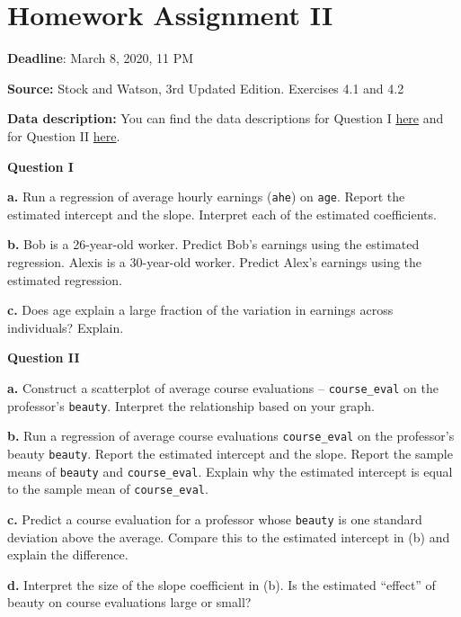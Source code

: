 \documentclass[
]{book}
\begin{document}
\hypertarget{homework-assignment-ii}{%
\chapter{Homework Assignment II}\label{homework-assignment-ii}}

\textbf{Deadline}: March 8, 2020, 11 PM

\textbf{Source:} Stock and Watson, 3rd Updated Edition. Exercises 4.1 and 4.2

\textbf{Data description:} You can find the data descriptions for Question I \href{https://wps.pearsoned.com/wps/media/objects/11422/11696965/empirical/empex_tb/CPS08_Description.pdf}{here} and for Question II \href{https://wps.pearsoned.com/wps/media/objects/11422/11696965/empirical/empex_tb/TeachingRatings_Description.pdf}{here}.

\textbf{Question I}

\textbf{a.} Run a regression of average hourly earnings (\texttt{ahe}) on \texttt{age}. Report the estimated intercept and the slope. Interpret each of the estimated coefficients.

\textbf{b.} Bob is a 26-year-old worker. Predict Bob's earnings using the estimated regression. Alexis is a 30-year-old worker. Predict Alex's earnings using the estimated regression.

\textbf{c.} Does age explain a large fraction of the variation in earnings across individuals? Explain.

\textbf{Question II}

\textbf{a.} Construct a scatterplot of average course evaluations -- \texttt{course\_eval} on the professor's \texttt{beauty}. Interpret the relationship based on your graph.

\textbf{b.} Run a regression of average course evaluations \texttt{course\_eval} on the professor's beauty \texttt{beauty}. Report the estimated intercept and the slope. Report the sample means of \texttt{beauty} and \texttt{course\_eval}. Explain why the estimated intercept is equal to the sample mean of \texttt{course\_eval}.

\textbf{c.} Predict a course evaluation for a professor whose \texttt{beauty} is one standard deviation above the average. Compare this to the estimated intercept in (b) and explain the difference.

\textbf{d.} Interpret the size of the slope coefficient in (b). Is the estimated ``effect'' of beauty on course evaluations large or small?
\end{document}
